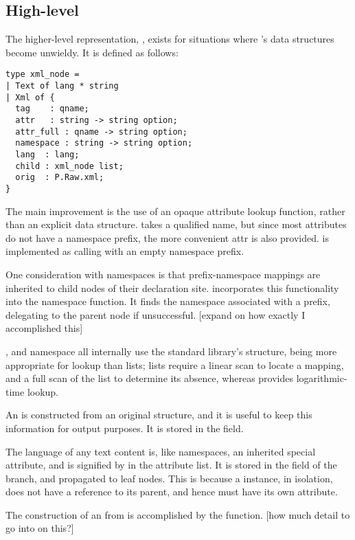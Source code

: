 \documentclass[12pt,a4paper,twoside,openright]{report}
\begin{document}
{\subsection{High-level }
The higher-level representation, , exists for situations where 's data structures become unwieldy. It is defined as follows:

\begin{lstlisting}[lanuage=ml]
type xml_node =
| Text of lang * string
| Xml of {
  tag    : qname;
  attr   : string -> string option;
  attr_full : qname -> string option;
  namespace : string -> string option;
  lang  : lang;
  child : xml_node list;
  orig  : P.Raw.xml;
}
\end{lstlisting}

The main improvement is the use of an opaque attribute lookup function, rather than an explicit data structure.  takes a qualified name, but since most attributes do not have a namespace prefix, the more convenient attr is also provided.  is implemented as calling  with an empty namespace prefix.

One consideration with namespaces is that prefix-namespace mappings are inherited to child nodes of their declaration site.  incorporates this functionality into the namespace function. It finds the namespace associated with a prefix, delegating to the parent node if unsuccessful. [expand on how exactly I accomplished this]

,  and namespace all internally use the standard library's  structure, being more appropriate for lookup than lists; lists require a linear scan to locate a mapping, and a full scan of the list to determine its absence, whereas  provides logarithmic-time lookup.

An  is constructed from an original  structure, and it is useful to keep this information for output purposes. It is stored in the  field.

The language of any text content is, like namespaces, an inherited special attribute, and is signified by  in the attribute list. It is stored in the  field of the branch, and propagated to leaf  nodes. This is because a  instance, in isolation, does not have a reference to its parent, and hence must have its own  attribute.

The construction of an  from  is accomplished by the  function. [how much detail to go into on this?]

}
\end{document}
